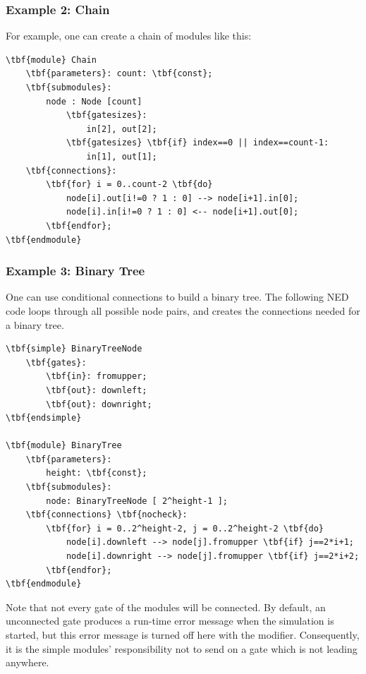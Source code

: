 \subsubsection{Example 2: Chain}


For example, one can create a chain of modules like this:

\begin{Verbatim}[commandchars=\\\{\}]
\tbf{module} Chain
    \tbf{parameters}: count: \tbf{const};
    \tbf{submodules}:
        node : Node [count]
            \tbf{gatesizes}:
                in[2], out[2];
            \tbf{gatesizes} \tbf{if} index==0 || index==count-1:
                in[1], out[1];
    \tbf{connections}:
        \tbf{for} i = 0..count-2 \tbf{do}
            node[i].out[i!=0 ? 1 : 0] --> node[i+1].in[0];
            node[i].in[i!=0 ? 1 : 0] <-- node[i+1].out[0];
        \tbf{endfor};
\tbf{endmodule}
\end{Verbatim}


\subsubsection{Example 3: Binary Tree}


One can use conditional connections to build a binary tree.
The following NED code loops through all possible node pairs, and
creates the connections needed for a binary tree.

\begin{Verbatim}[commandchars=\\\{\}]
\tbf{simple} BinaryTreeNode
    \tbf{gates}:
        \tbf{in}: fromupper;
        \tbf{out}: downleft;
        \tbf{out}: downright;
\tbf{endsimple}

\tbf{module} BinaryTree
    \tbf{parameters}:
        height: \tbf{const};
    \tbf{submodules}:
        node: BinaryTreeNode [ 2^height-1 ];
    \tbf{connections} \tbf{nocheck}:
        \tbf{for} i = 0..2^height-2, j = 0..2^height-2 \tbf{do}
            node[i].downleft --> node[j].fromupper \tbf{if} j==2*i+1;
            node[i].downright --> node[j].fromupper \tbf{if} j==2*i+2;
        \tbf{endfor};
\tbf{endmodule}
\end{Verbatim}

Note that not every gate of the modules will be connected. By default,
an unconnected gate produces a run-time error message when the
simulation is started, but this error message is turned off here with
the  modifier.  Consequently, it
is the simple modules' responsibility not to send on a gate which is
not leading anywhere.

